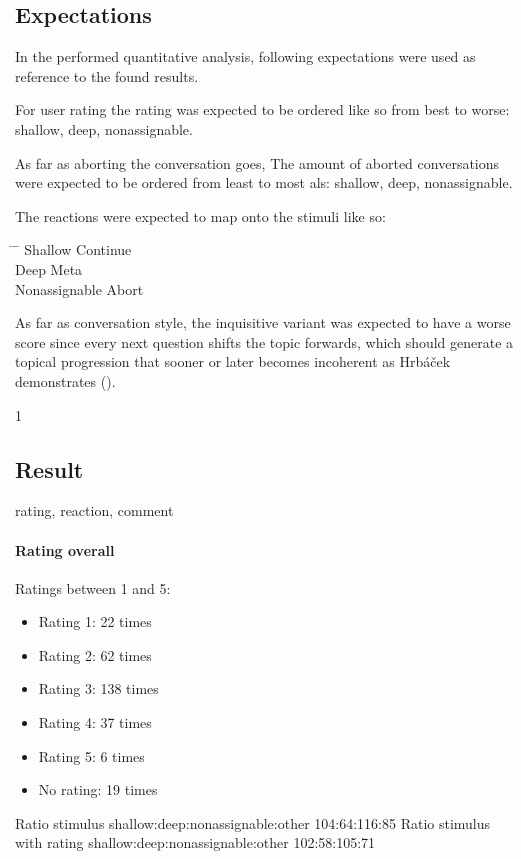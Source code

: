 \subsection{Expectations}

In the performed quantitative analysis,
following expectations were used as reference to the found results.

For user rating the rating was expected to be ordered like so from best to worse:
shallow, deep, nonassignable.

As far as aborting the conversation goes,
The amount of aborted conversations were expected to be ordered
from least to most als:
shallow, deep, nonassignable.

The reactions were expected to map onto the stimuli like so:

\begin{tabbing}
\hspace{4cm} \= \hspace{4cm} \= \kill %
Shallow \> Continue \\
Deep \> Meta \\
Nonassignable \> Abort \\
\end{tabbing}

As far as conversation style, the inquisitive variant was expected to have a worse score
since every next question shifts the topic forwards, which should generate a topical progression
that sooner or later becomes incoherent as Hrbáček demonstrates ().

1
\subsection{Result}

rating, reaction, comment

\paragraph{Rating overall}
Ratings between 1 and 5:

\begin{itemize}
\item Rating 1: 22 times
\item Rating 2: 62 times
\item Rating 3: 138 times
\item Rating 4: 37 times
\item Rating 5: 6 times
\item No rating: 19 times
\end{itemize}
Ratio stimulus shallow:deep:nonassignable:other 104:64:116:85
Ratio stimulus with rating shallow:deep:nonassignable:other 102:58:105:71

